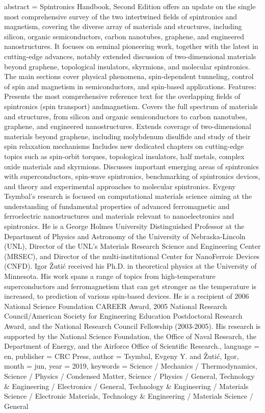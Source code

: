 {{	abstract = {Spintronics Handbook, Second Edition offers an update on the single most comprehensive survey of the two intertwined fields of spintronics and magnetism, covering the diverse array of materials and structures, including silicon, organic semiconductors, carbon nanotubes, graphene, and engineered nanostructures. It focuses on seminal pioneering work, together with the latest in cutting-edge advances, notably extended discussion of two-dimensional materials beyond graphene, topological insulators, skyrmions, and molecular spintronics. The main sections cover physical phenomena, spin-dependent tunneling, control of spin and magnetism in semiconductors, and spin-based applications. Features:   Presents the most comprehensive reference text for the overlapping fields of spintronics (spin transport) andmagnetism. Covers the full spectrum of materials and structures, from silicon and organic semiconductors to carbon nanotubes, graphene, and engineered nanostructures. Extends coverage of two-dimensional materials beyond graphene, including molybdenum disulfide and study of their spin relaxation mechanisms Includes new dedicated chapters on cutting-edge topics such as spin-orbit torques, topological insulators, half metals, complex oxide materials and skyrmions. Discusses important emerging areas of spintronics with superconductors, spin-wave spintronics, benchmarking of spintronics devices, and theory and experimental approaches to molecular spintronics. Evgeny Tsymbal's research is focused on computational materials science aiming at the understanding of fundamental properties of advanced ferromagnetic and ferroelectric nanostructures and materials relevant to nanoelectronics and spintronics. He is a George Holmes University Distinguished Professor at the Department of Physics and Astronomy of the University of Nebraska-Lincoln (UNL), Director of the UNL’s Materials Research Science and Engineering Center (MRSEC), and Director of the multi-institutional Center for NanoFerroic Devices (CNFD).  Igor Žutić received his Ph.D. in theoretical physics at the University of Minnesota. His work spans a range of topics from high-temperature superconductors and ferromagnetism that can get stronger as the temperature is increased, to prediction of various spin-based devices. He is a recipient of 2006 National Science Foundation CAREER Award, 2005 National Research Council/American Society for Engineering Education Postdoctoral Research Award, and the National Research Council Fellowship (2003-2005). His research is supported by the National Science Foundation, the Office of Naval Research, the Department of Energy, and the Airforce Office of Scientific Research.},
	language = {en},
	publisher = {CRC Press},
	author = {Tsymbal, Evgeny Y. and Žutić, Igor},
	month = jun,
	year = {2019},
	keywords = {Science / Mechanics / Thermodynamics, Science / Physics / Condensed Matter, Science / Physics / General, Technology \& Engineering / Electronics / General, Technology \& Engineering / Materials Science / Electronic Materials, Technology \& Engineering / Materials Science / General}
}

}
